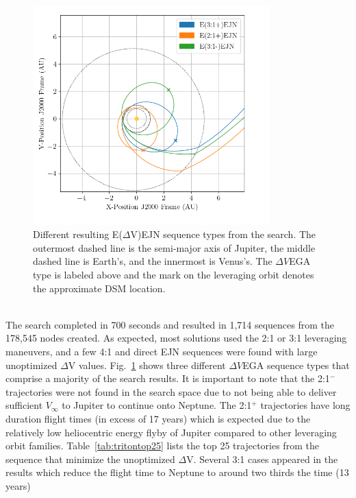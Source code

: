 \documentclass[letterpaper, paper,11pt]{./AAS}		%
\begin{document}
%
%
%
\begin{figure}[ht]
	\centering\includegraphics[width=3.6in]{./Figures/tridentMCTS}
	\caption{Different resulting E($\Delta$V)EJN sequence types from the search. The outermost dashed line is the semi-major axis of Jupiter, the middle dashed line is Earth's, and the innermost is Venus's. The $\Delta V$EGA type is labeled above and the mark on the leveraging orbit denotes the approximate DSM location.}
	\label{fig:tridentMCTS}
\end{figure}
%
%
\\\indent The search completed in 700 seconds and resulted in 1,714 sequences from the 178,545 nodes created. As expected, most solutions used the 2:1 or 3:1 leveraging maneuvers, and a few 4:1 and direct EJN sequences were found with large unoptimized $\Delta$V values. Fig.~\ref{fig:tridentMCTS} shows three different $\Delta V$EGA sequence types that comprise a majority of the search results. It is important to note that the 2:1$^{-}$ trajectories were not found in the search space due to not being able to deliver sufficient $V_\infty$ to Jupiter to continue onto Neptune. The 2:1$^{+}$ trajectories have long duration flight times (in excess of 17 years) which is expected due to the relatively low heliocentric energy flyby of Jupiter compared to other leveraging orbit families. Table~\ref{tab:tritontop25} lists the top 25 trajectories from the sequence that minimize the unoptimized $\Delta$V. Several 3:1 cases appeared in the results which reduce the flight time to Neptune to around two thirds the time (13 years) 
%
%
\end{document}
